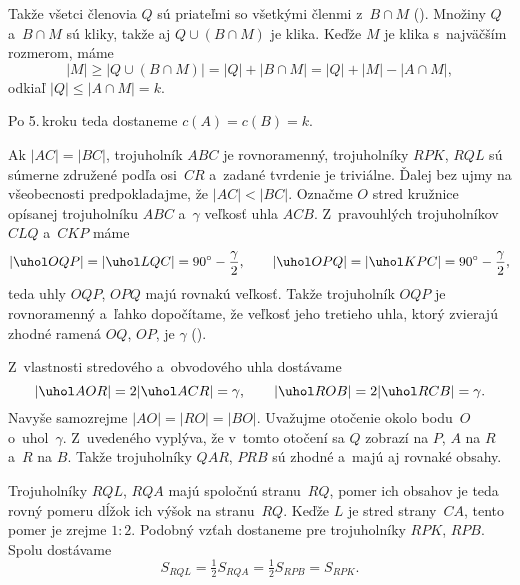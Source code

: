 {\noindent
Takže všetci členovia $Q$ sú priateľmi so všetkými členmi z~$B\cap M$ (\obr). Množiny $Q$ a~$B\cap M$ sú kliky, takže aj $Q\cup(B\cap M)$ je klika. Keďže $M$ je klika s~najväčším rozmerom, máme
$$
  |M| \ge |Q\cup(B\cap M)| = |Q|+|B\cap M| = |Q|+|M|-|A\cap M|,
$$ 
odkiaľ $|Q|\le |A\cap M|=k$.

Po 5.\,kroku teda dostaneme $c(A)=c(B)=k$.
}

{%
Ak $|AC|=|BC|$, trojuholník $ABC$ je rovnoramenný, trojuholníky $RPK$, $RQL$ sú súmerne združené podľa osi~$CR$ a~zadané tvrdenie je triviálne. Ďalej bez ujmy na všeobecnosti predpokladajme, že $|AC|<|BC|$. Označme $O$ stred kružnice opísanej trojuholníku $ABC$ a~$\gamma$ veľkosť uhla $ACB$. Z~pravouhlých trojuholníkov $CLQ$ a~$CKP$ máme
$$
|\uhol OQP|=|\uhol LQC|=90^{\circ}-\frac{\gamma}2,\qquad|\uhol OPQ|=|\uhol KPC|=90^{\circ}-\frac{\gamma}2,
$$
teda uhly $OQP$, $OPQ$ majú rovnakú veľkosť. Takže trojuholník $OQP$ je rovnoramenný a~ľahko dopočítame, že veľkosť jeho tretieho uhla, ktorý zvierajú zhodné ramená $OQ$, $OP$, je $\gamma$ (\obr).
%

Z~vlastnosti stredového a~obvodového uhla dostávame
$$
|\uhol AOR|=2|\uhol ACR|=\gamma,\qquad|\uhol ROB|=2|\uhol RCB|=\gamma.
$$
Navyše samozrejme $|AO|=|RO|=|BO|$. Uvažujme otočenie okolo bodu~$O$ o~uhol~$\gamma$. Z~uvedeného vyplýva, že v~tomto otočení sa $Q$ zobrazí na $P$, $A$ na $R$ a~$R$ na $B$. Takže trojuholníky $QAR$, $PRB$ sú zhodné a~majú aj rovnaké obsahy.

Trojuholníky $RQL$, $RQA$ majú spoločnú stranu~$RQ$, pomer ich obsahov je teda rovný pomeru dĺžok ich výšok na stranu~$RQ$. Keďže $L$ je stred strany~$CA$, tento pomer je zrejme $1:2$. Podobný vzťah dostaneme pre trojuholníky $RPK$, $RPB$. Spolu dostávame
$$
S_{RQL}=\tfrac12S_{RQA}=\tfrac12S_{RPB}=S_{RPK}.
$$
}

